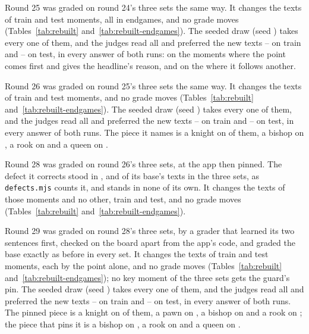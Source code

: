 \documentclass[11pt]{article}
\begin{document}
Round 25 was graded on round 24's three sets the same way. It changes the texts of
\RoundTwentyFiveChangedTrain{} train and \RoundTwentyFiveChangedTest{} test moments, all in
endgames, and no grade moves (Tables~\ref{tab:rebuilt} and~\ref{tab:rebuilt-endgames}). The seeded
draw (seed \RoundTwentyFiveSeed) takes every one of them, and the judges read all
\RoundTwentyFiveJudged{} and preferred the new texts
\RoundTwentyFiveTrainNew--\RoundTwentyFiveTrainOld{} on train and
\RoundTwentyFiveTestNew--\RoundTwentyFiveTestOld{} on test, in every answer of both runs: on the
\RoundTwentyFiveFirst{} moments where the point comes first and gives the headline's reason, and on
the \RoundTwentyFiveSecond{} where it follows another.

Round 26 was graded on round 25's three sets the same way. It changes the texts of
\RoundTwentySixChangedTrain{} train and \RoundTwentySixChangedTest{} test moments, and no grade
moves (Tables~\ref{tab:rebuilt} and~\ref{tab:rebuilt-endgames}). The seeded draw (seed
\RoundTwentySixSeed) takes every one of them, and the judges read all \RoundTwentySixJudged{} and
preferred the new texts \RoundTwentySixTrainNew--\RoundTwentySixTrainOld{} on train and
\RoundTwentySixTestNew--\RoundTwentySixTestOld{} on test, in every answer of both runs. The piece
it names is a knight on \RoundTwentySixKnights{} of them, a bishop on \RoundTwentySixBishops, a
rook on \RoundTwentySixRooks{} and a queen on \RoundTwentySixQueens.

Round 28 was graded on round 26's three sets, at the app then pinned. The defect it corrects stood
in \RoundTwentyEightDefectsGames, \RoundTwentyEightDefectsEnd{} and \RoundTwentyEightDefectsEndTwo{}
of its base's texts in the three sets, as \texttt{defects.mjs} counts it, and stands in none of
its own. It changes the texts of those \RoundTwentyEightDefects{} moments and no other,
\RoundTwentyEightChangedTrain{} train and \RoundTwentyEightChangedTest{} test, and no grade moves
(Tables~\ref{tab:rebuilt} and~\ref{tab:rebuilt-endgames}).

Round 29 was graded on round 28's three sets, by a grader that learned its two sentences first,
checked on the board apart from the app's code, and graded the base exactly as before in every set.
It changes the texts of \RoundTwentyNineChangedTrain{} train and \RoundTwentyNineChangedTest{} test
moments, each by the point alone, and no grade moves (Tables~\ref{tab:rebuilt}
and~\ref{tab:rebuilt-endgames}); no key moment of the three sets gets the guard's pin. The seeded
draw (seed \RoundTwentyNineSeed) takes every one of them, and the judges read all
\RoundTwentyNineJudged{} and preferred the new texts \RoundTwentyNineTrainNew--\RoundTwentyNineTrainOld{}
on train and \RoundTwentyNineTestNew--\RoundTwentyNineTestOld{} on test, in every answer of both
runs. The pinned piece is a knight on \RoundTwentyNinePinnedKnights{} of them, a pawn on
\RoundTwentyNinePinnedPawns, a bishop on \RoundTwentyNinePinnedBishops{} and a rook on
\RoundTwentyNinePinnedRooks; the piece that pins it is a bishop on \RoundTwentyNinePinnerBishops, a
rook on \RoundTwentyNinePinnerRooks{} and a queen on \RoundTwentyNinePinnerQueens.
\end{document}
